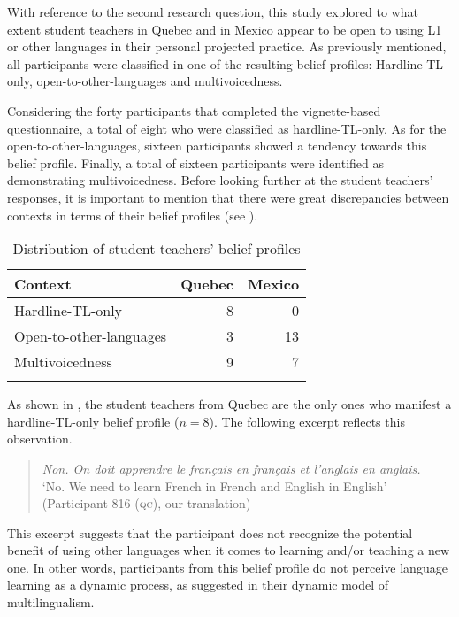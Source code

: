 \documentclass[output=paper]{../langscibook}
\begin{document}
With reference to the second research question, this study explored to what extent student teachers in Quebec and in Mexico appear to be open to using L1 or other languages in their personal projected practice. As previously mentioned, all participants were classified in one of the resulting belief profiles: Hardline-TL-only, open-to-other-languages and multivoicedness. 

Considering the forty participants that completed the vignette-based questionnaire, a total of eight who were classified as hardline-TL-only. As for the open-to-other-languages, sixteen participants showed a tendency towards this belief profile. Finally, a total of sixteen participants were identified as demonstrating multivoicedness. Before looking further at the student teachers’ responses, it is important to mention that there were great discrepancies between contexts in terms of their belief profiles (see ).

\begin{table}
\begin{tabular}{lrr}
\lsptoprule
Context & Quebec & Mexico\\\midrule
Hardline-TL-only & 8 & 0\\
Open-to-other-languages & 3 & 13\\
Multivoicedness & 9 & 7\\
\lspbottomrule
\end{tabular}
\caption{\label{tab:paquet:2}Distribution of student teachers’ belief profiles}
\end{table}

As shown in , the student teachers from Quebec are the only ones who manifest a hardline-TL-only belief profile ($n=8$). The following excerpt reflects this observation.

\begin{quote}
\emph{Non. On doit apprendre le français en français et l'anglais en anglais.}\smallskip\\
`No. We need to learn French in French and English in English' (Participant 816 (\textsc{qc}), our translation)
\end{quote}

This excerpt suggests that the participant does not recognize the potential benefit of using other languages when it comes to learning and/or teaching a new one. In other words, participants from this belief profile do not perceive language learning as a dynamic process, as \citet{HerdinaJessner2002} suggested in their dynamic model of multilingualism. 
\end{document}
